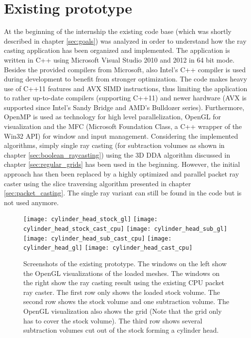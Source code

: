 \section{Existing prototype}
\label{sec:existing_prototype}

At the beginning of the internship the existing code base (which was shortly described in chapter \ref{sec:goals}) was analyzed in order to understand how the ray casting application has been organized and implemented. The application is written in C++ using Microsoft Visual Studio 2010 and 2012 in 64 bit mode. Besides the provided compilers from Microsoft, also Intel's C++ compiler is used during development to benefit from stronger optimization. The code makes heavy use of C++11 features and AVX SIMD instructions, thus limiting the application to rather up-to-date compilers (supporting C++11) and newer hardware (AVX is supported since Intel's Sandy Bridge and AMD's Bulldozer series). Furthermore, OpenMP is used as technology for high level parallelization, OpenGL for visualization and the MFC (Microsoft Foundation Class, a C++ wrapper of the Win32 API) for window and input management.
Considering the implemented algorithms, simply single ray casting (for subtraction volumes as shown in chapter \ref{sec:boolean_raycasting}) using the 3D DDA algorithm discussed in chapter \ref{sec:regular_grids} has been used in the beginning. However, the initial approach has then been replaced by a highly optimized and parallel packet ray caster using the slice traversing algorithm presented in chapter \ref{sec:packet_casting}. The single ray variant can still be found in the code but is not used anymore.

\begin{figure}
\centering
\texttt{[image: cylinder\_head\_stock\_gl]}
\texttt{[image: cylinder\_head\_stock\_cast\_cpu]}
\texttt{[image: cylinder\_head\_sub\_gl]}
\texttt{[image: cylinder\_head\_sub\_cast\_cpu]}
\texttt{[image: cylinder\_head\_gl]}
\texttt{[image: cylinder\_head\_cast\_cpu]}
\caption{Screenshots of the existing prototype. The windows on the left show the OpenGL visualizations of the loaded meshes. The windows on the right show the ray casting result using the existing CPU packet ray caster. The first row only shows the loaded stock volume. The second row shows the stock volume and one subtraction volume. The OpenGL visualization also shows the grid (Note that the grid only has to cover the stock volume). The third row shows several subtraction volumes cut out of the stock forming a cylinder head.}
\label{fig:cylinder_head}
\end{figure}

